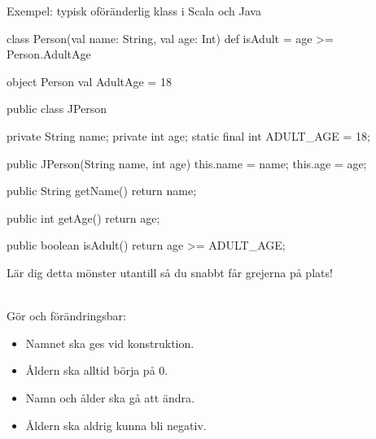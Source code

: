 \begin{Slide}{Exempel: typisk oföränderlig klass i Scala och Java}\SlideFontTiny
\vspace{-1em}
\begin{multicols}{2}
\begin{CodeSmall}[basicstyle=\ttfamily\SlideFontSize{5.7}{6.7}]
class Person(val name: String, val age: Int){
  def isAdult = age >= Person.AdultAge
}

object Person {
  val AdultAge = 18
}
\end{CodeSmall}

\columnbreak

\pause
\begin{CodeSmall}[language=Java,basicstyle=\ttfamily\SlideFontSize{5.7}{6.7}]
public class JPerson {
    private String name;
    private int age;
    static final int ADULT_AGE = 18;
      
    public JPerson(String name, int age){
      this.name = name;
      this.age = age;
    }

    public String getName(){
        return name;
    }

    public int getAge(){
        return age;
    }
    
    public boolean isAdult(){
        return age >= ADULT_AGE;
    }
}
\end{CodeSmall}
Lär dig detta mönster utantill så du snabbt får grejerna på plats!
\end{multicols}
\pause\vspace{-10em} \\Gör  och  förändringsbar:
\begin{itemize}
\item Namnet ska ges vid konstruktion.
\item Åldern ska alltid börja på 0.
\item Namn och ålder ska gå att ändra.
\item Åldern ska aldrig kunna bli negativ.
\end{itemize}
\end{Slide}


